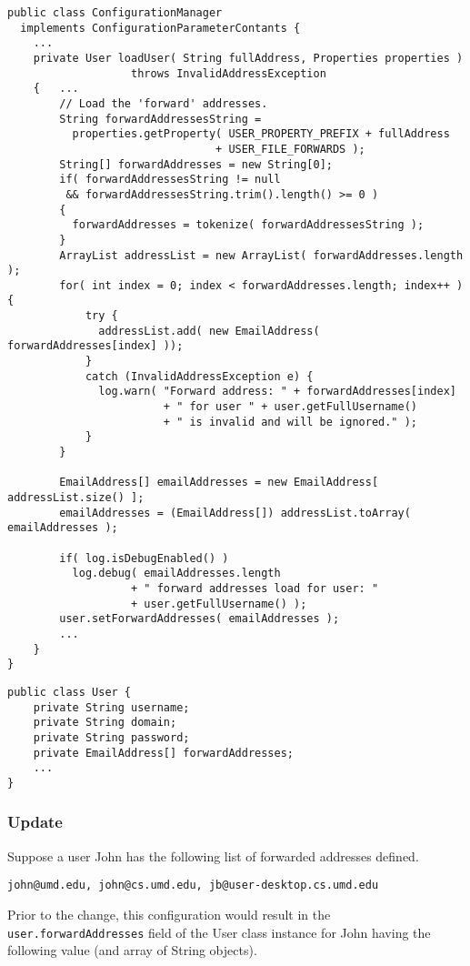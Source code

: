 \begin{lstlisting}
public class ConfigurationManager
  implements ConfigurationParameterContants {
    ...
    private User loadUser( String fullAddress, Properties properties )
                   throws InvalidAddressException
    {   ...
        // Load the 'forward' addresses.
        String forwardAddressesString =
          properties.getProperty( USER_PROPERTY_PREFIX + fullAddress 
                                + USER_FILE_FORWARDS );
        String[] forwardAddresses = new String[0];
        if( forwardAddressesString != null 
         && forwardAddressesString.trim().length() >= 0 )
        {
          forwardAddresses = tokenize( forwardAddressesString );
        }
        ArrayList addressList = new ArrayList( forwardAddresses.length );
        for( int index = 0; index < forwardAddresses.length; index++ ) {
            try {
              addressList.add( new EmailAddress( forwardAddresses[index] ));
            }
            catch (InvalidAddressException e) {
              log.warn( "Forward address: " + forwardAddresses[index]
                        + " for user " + user.getFullUsername()
                        + " is invalid and will be ignored." );
            }
        }

        EmailAddress[] emailAddresses = new EmailAddress[ addressList.size() ];
        emailAddresses = (EmailAddress[]) addressList.toArray( emailAddresses );

        if( log.isDebugEnabled() ) 
          log.debug( emailAddresses.length
                   + " forward addresses load for user: "
                   + user.getFullUsername() );
        user.setForwardAddresses( emailAddresses );
        ...
    }
}
\end{lstlisting}

\begin{lstlisting}
public class User {
    private String username;
    private String domain;
    private String password;
    private EmailAddress[] forwardAddresses;
    ...
}
\end{lstlisting}


\subsubsection{Update}

Suppose a user John has the following list of forwarded addresses
defined.
\begin{verbatim}
john@umd.edu, john@cs.umd.edu, jb@user-desktop.cs.umd.edu
\end{verbatim}
Prior to the change, this configuration would result in the
\texttt{user.forwardAddresses} field of the User class instance for
John having the following value (and array of String objects).

